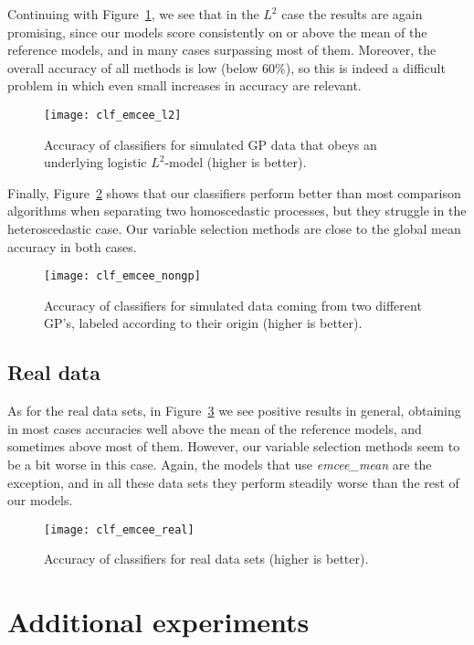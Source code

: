 Continuing with Figure~\ref{fig:clf_emcee_l2}, we see that in the \(L^2\) case the results are again promising, since our models score consistently on or above the mean of the reference models, and in many cases surpassing most of them. Moreover, the overall accuracy of all methods is low (below 60\%), so this is indeed a difficult problem in which even small increases in accuracy are relevant.

\begin{figure}[ht!]
  \centering
  \texttt{[image: clf\_emcee\_l2]}
  \caption{Accuracy of classifiers for simulated GP data that obeys an underlying logistic \(L^2\)-model (higher is better).}\label{fig:clf_emcee_l2}
\end{figure}

Finally, Figure~\ref{fig:clf_emcee_nongp} shows that our classifiers perform better than most comparison algorithms when separating two homoscedastic processes, but they struggle in the heteroscedastic case. Our variable selection methods are close to the global mean accuracy in both cases.

\begin{figure}[ht!]
  \centering
  \texttt{[image: clf\_emcee\_nongp]}
  \caption{Accuracy of classifiers for simulated data coming from two different GP's, labeled according to their origin (higher is better).}\label{fig:clf_emcee_nongp}
\end{figure}

\subsection*{Real data}

As for the real data sets, in Figure~\ref{fig:clf_emcee_real} we see positive results in general, obtaining in most cases accuracies well above the mean of the reference models, and sometimes above most of them. However, our variable selection methods seem to be a bit worse in this case. Again, the models that use \textit{emcee\_mean} are the exception, and in all these data sets they perform steadily worse than the rest of our models.

\begin{figure}[ht!]
  \centering
  \texttt{[image: clf\_emcee\_real]}
  \caption{Accuracy of classifiers for real data sets (higher is better).}\label{fig:clf_emcee_real}
\end{figure}


\section{Additional experiments}

